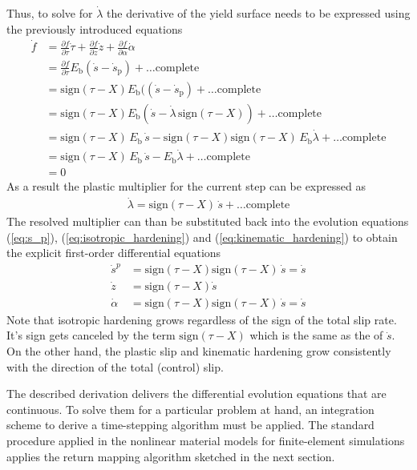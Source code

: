 \documentclass[main.tex]{subfiles}
\begin{document}
Thus, to solve for $\dot{\lambda}$ the derivative of the yield surface needs to be expressed using the previously introduced equations
\begin{align}
\dot{f} &= \frac{\partial f}{\partial \tau} \dot{\tau} +
\frac{\partial f}{\partial z} 
\dot{z} +
\frac{\partial f}{\partial \alpha} \dot{\alpha}
\nonumber \\
&= \frac{\partial f}{\partial \tau} E_\mathrm{b} ( \dot{s} - \dot{s}_\mathrm{p} )
+ \ldots \mathrm{complete}
\nonumber \\
&= \mathrm{sign}(\tau - X) E_\mathrm{b} (( \dot{s} - \dot{s}_\mathrm{p} )
+ \ldots \mathrm{complete}
\nonumber \\
&= \mathrm{sign}(\tau - X) E_\mathrm{b} ( \dot{s} - \dot{\lambda} \, \mathrm{sign}(\tau - X)  )
+ \ldots \mathrm{complete}
\nonumber \\
&= \mathrm{sign}(\tau - X) \, E_\mathrm{b}
\, \dot{s} 
- 
\mathrm{sign}(\tau - X) \mathrm{sign}(\tau - X) \,
E_\mathrm{b}
\dot{\lambda} 
+ \ldots \mathrm{complete}
\nonumber \\
&= \mathrm{sign}(\tau - X) \, E_\mathrm{b}
\, \dot{s} 
- 
E_\mathrm{b}
\dot{\lambda}
+ \ldots \mathrm{complete}
\nonumber \\
&= 0
\end{align}
As a result the plastic multiplier for the current step can be expressed as 
\begin{align}
\dot{\lambda} = \mathrm{sign}(\tau - X) \, \dot{s} 
+ \ldots \mathrm{complete}
\end{align}
The resolved multiplier can than be substituted back into the evolution equations (\ref{eq:s_p}), (\ref{eq:isotropic_hardening}) and (\ref{eq:kinematic_hardening}) to obtain the explicit first-order differential equations 
\begin{align}
\dot{s}^p &= 
\mathrm{sign}(\tau - X) 
\mathrm{sign}(\tau - X) 
\, \dot{s}
= \dot{s}
\\ 
\dot{z} 
&= \mathrm{sign}(\tau - X) \dot{s}
\\
\dot{\alpha} &= 
\mathrm{sign}(\tau - X)  \mathrm{sign}(\tau - X) \, \dot{s}
= \dot{s}
\end{align}
Note that isotropic hardening grows regardless of the sign of the total slip rate. It's sign gets canceled by the term $\mathrm{sign}(\tau - X)$ which is the same as the of $\dot{s}$. On the other hand, the plastic slip and kinematic hardening grow consistently with the direction of the total (control) slip.

The described derivation delivers the differential evolution equations that are continuous. To solve them for a particular problem at hand, an integration scheme to derive a time-stepping algorithm must be applied. The standard procedure applied in the nonlinear material models for finite-element simulations applies the return mapping algorithm sketched in the next section. 
\end{document}
